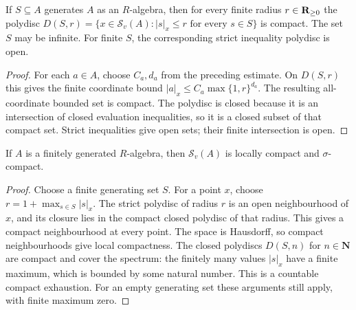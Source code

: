 \begin{theorem}
\label{spectrum:relative-generating-polydisc}
\leanok
{}
If $S\subseteq A$ generates $A$ as an $R$-algebra, then for every finite
radius $r\in\mathbf{R}_{\ge0}$ the polydisc
$D(S,r)=\{x\in\mathcal S_v(A):|s|_x\le r\text{ for every }s\in S\}$ is compact.
The set $S$ may be infinite. For finite $S$, the corresponding strict
inequality polydisc is open.
\end{theorem}
\begin{proof}
For each $a\in A$, choose $C_a,d_a$ from the preceding estimate.
On $D(S,r)$ this gives the finite coordinate bound
$|a|_x\le C_a\max\{1,r\}^{d_a}$. The resulting all-coordinate bounded
set is compact. The polydisc is closed because it is an intersection of
closed evaluation inequalities, so it is a closed subset of that compact
set. Strict inequalities give open sets; their finite intersection is open.
\end{proof}

\begin{theorem}
\label{spectrum:relative-finite-type-topology}
\leanok
{}
If $A$ is a finitely generated $R$-algebra, then $\mathcal S_v(A)$ is locally
compact and $\sigma$-compact.
\end{theorem}
\begin{proof}
Choose a finite generating set $S$. For a point $x$, choose
$r=1+\max_{s\in S}|s|_x$. The strict polydisc of radius $r$ is an open
neighbourhood of $x$, and its closure lies in the compact closed polydisc
of that radius. This gives a compact neighbourhood at every point.
The space is Hausdorff, so compact neighbourhoods give local compactness.
The closed polydiscs $D(S,n)$ for $n\in\mathbf N$ are compact and cover
the spectrum: the finitely many values $|s|_x$ have a finite maximum, which
is bounded by some natural number. This is a countable compact exhaustion.
For an empty generating set these arguments still apply, with finite
maximum zero.
\end{proof}

